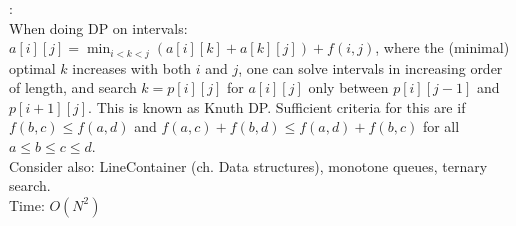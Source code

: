 :\\When doing DP on intervals:\\
$a[i][j] = \min_{i < k < j}(a[i][k] + a[k][j]) + f(i, j)$, where the (minimal)
optimal $k$ increases with both $i$ and $j$, one can solve intervals in increasing
order of length, and search $k = p[i][j]$ for $a[i][j]$ only between $p[i][j-1]$
and $p[i+1][j]$. This is known as Knuth DP. Sufficient criteria for this are if
$f(b,c) \le f(a,d)$ and $f(a,c) + f(b,d) \le f(a,d) + f(b,c)$ for all $a \le b \le c \le d$.\\
Consider also: LineContainer (ch. Data structures), monotone queues, ternary search.\\
Time: $O(N^2)$
